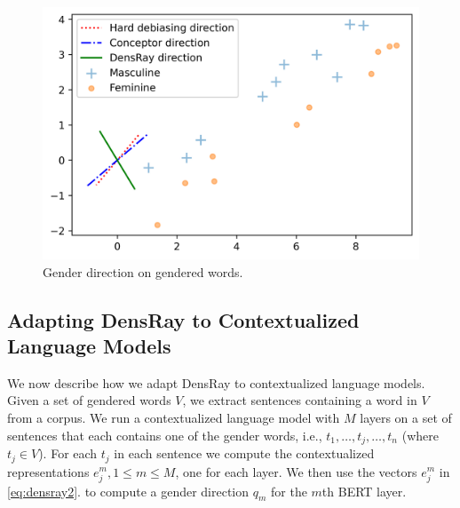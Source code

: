 \begin{figure}[h]
	\centering
	\includegraphics[width=0.5\linewidth]{examples.png}
	\caption{Gender direction on gendered words.}
\end{figure}

\subsection{Adapting DensRay to Contextualized Language Models}
We now describe how we adapt DensRay to contextualized
language models. Given a set of gendered words
$V$, we extract sentences containing a word in $V$ from a
corpus. We run a contextualized language model
with $M$ layers
on a set of 
sentences that each contains one of the gender words, i.e., 
$t_1,\ldots,t_j,\ldots,t_n$ (where $t_j \in V$). 
For each $t_j $ in each sentence we  compute the contextualized representations $e_j^m, 1\leq m
\leq M$, one for each layer. We then use the vectors $e_j^m$ in \eqref{eq:densray2}.
to compute a gender direction
$q_m$ for the $m$th BERT layer. 
